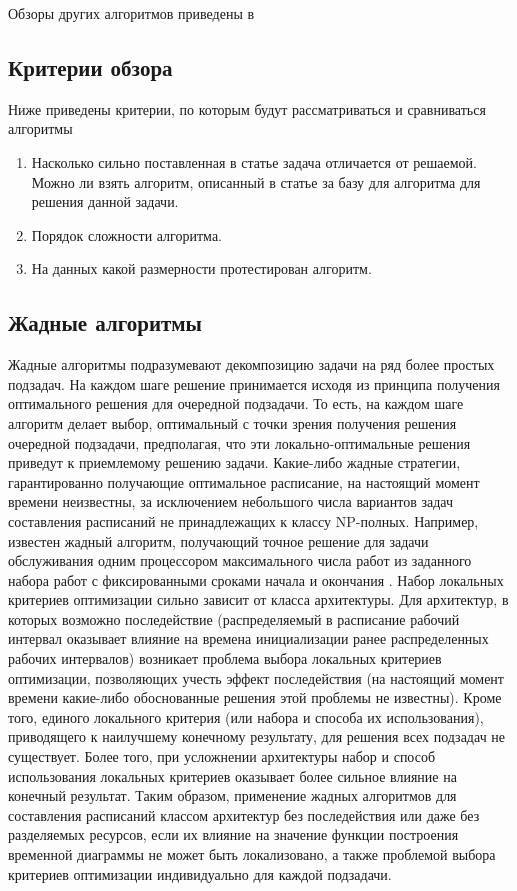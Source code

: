 Обзоры других алгоритмов приведены в \cite{Shakhbazyan_1981,Davis_2011}
\subsection{Критерии обзора}
Ниже приведены критерии, по которым будут рассматриваться и сравниваться алгоритмы
\begin{enumerate}
    \item Насколько сильно поставленная в статье задача отличается от решаемой. Можно ли взять алгоритм, описанный в статье за базу для алгоритма для решения данной задачи.
    \item Порядок сложности алгоритма.
    \item На данных какой размерности протестирован алгоритм.
\end{enumerate}
\subsection{Жадные алгоритмы}
Жадные алгоритмы подразумевают декомпозицию задачи на ряд более простых подзадач. На каждом шаге решение принимается исходя из принципа получения оптимального решения для очередной подзадачи. То есть, на каждом шаге алгоритм делает выбор, оптимальный с точки зрения получения решения очередной подзадачи, предполагая, что эти локально-оптимальные решения приведут к приемлемому решению задачи. Какие-либо жадные стратегии, гарантированно получающие оптимальное расписание, на настоящий момент времени неизвестны, за исключением небольшого числа вариантов задач составления расписаний не принадлежащих к классу NP-полных. Например, известен жадный алгоритм, получающий точное решение для задачи обслуживания одним процессором максимального числа работ из заданного набора работ с фиксированными сроками начала и окончания \cite{Cormen}. Набор локальных критериев оптимизации сильно зависит от класса архитектуры. Для архитектур, в которых возможно последействие (распределяемый в расписание рабочий интервал оказывает влияние на времена инициализации ранее распределенных рабочих интервалов) возникает проблема выбора локальных критериев оптимизации, позволяющих учесть эффект последействия (на настоящий момент времени какие-либо обоснованные решения этой проблемы не известны). Кроме того, единого локального критерия (или набора и способа их использования), приводящего к наилучшему конечному результату, для решения всех подзадач не существует. Более того, при усложнении архитектуры набор и способ использования локальных критериев оказывает более сильное влияние на конечный результат. Таким образом, применение жадных алгоритмов для составления расписаний классом архитектур без последействия или даже без разделяемых ресурсов, если их влияние на значение функции построения временной диаграммы не может быть локализовано, а также проблемой выбора критериев оптимизации индивидуально для каждой подзадачи.


